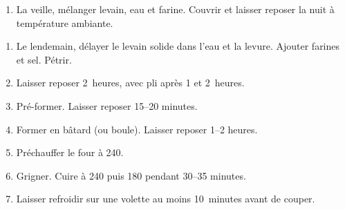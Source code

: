 

\begin{ingredients}
\end{ingredients}

\begin{recipe}
  \begin{enumerate}

  \item La veille, mélanger levain, eau et farine.  Couvrir et laisser
    reposer la nuit à température ambiante.

  \end{enumerate}
\end{recipe}


\begin{ingredients}
\end{ingredients}

\begin{recipe}
  \begin{enumerate}

  \item Le lendemain, délayer le levain solide dans l'eau et la
    levure.  Ajouter farines et sel.  Pétrir.

  \item Laisser reposer 2$\,$\fracH{} heures, avec pli après 1 et
    2~heures.

  \item Pré-former.  Laisser reposer 15--20 minutes.

  \item Former en bâtard (ou boule).  Laisser reposer 1\fracH--2
    heures.

  \item Préchauffer le four à 240\degreeC.

  \item Grigner.  Cuire à 240\degreeC{} puis 180\degreeC{} pendant
    30--35 minutes.

  \item Laisser refroidir sur une volette au moins 10~minutes avant de
    couper.

  \end{enumerate}
\end{recipe}

